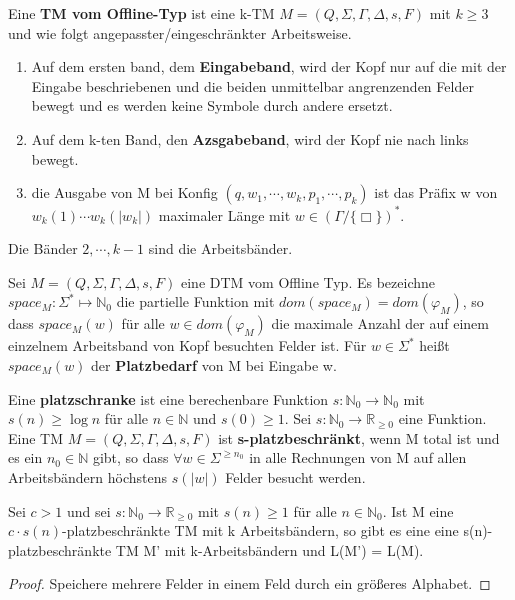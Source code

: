 {}

    Eine \textbf{TM vom Offline-Typ} ist eine k-TM \(M = (Q, \Sigma, \Gamma, \Delta, s, F)\) mit \(k \geq 3\) und wie folgt angepasster/eingeschränkter Arbeitsweise.
    \begin{enumerate}
        \item Auf dem ersten band, dem \textbf{Eingabeband}, wird der Kopf nur auf die mit der Eingabe beschriebenen und die beiden unmittelbar angrenzenden Felder bewegt und es werden keine Symbole durch andere ersetzt.
        \item Auf dem k-ten Band, den \textbf{Azsgabeband}, wird der Kopf nie nach links bewegt.
        \item die Ausgabe von M bei Konfig \((q, w_1,\cdots, w_k, p_1, \cdots, p_k)\) ist das Präfix w von \(w_k(1) \cdots w_k(|w_k|)\) maximaler Länge mit \(w \in (\Gamma / \{\Box\})^*\).
    \end{enumerate}
    Die Bänder \(2, \cdots, k-1\) sind die Arbeitsbänder.

    Sei \(M = (Q, \Sigma, \Gamma, \Delta, s, F)\) eine DTM vom Offline Typ. Es bezeichne \(space_M : \Sigma^* \mapsto \mathbb{N}_0\) die partielle Funktion mit \(dom(space_M) = dom(\varphi_M)\), so dass \(space_M(w)\) für alle \(w \in dom(\varphi_M)\) die maximale Anzahl der auf einem einzelnem Arbeitsband von Kopf besuchten Felder ist. Für \(w \in \Sigma^*\) heißt \(space_M(w)\) der \textbf{Platzbedarf} von M bei Eingabe w.

    Eine \textbf{platzschranke} ist eine berechenbare Funktion \(s: \mathbb{N}_0 \to \mathbb{N}_0\) mit \(s(n) \geq \log n\) für alle \(n \in \mathbb{N}\) und \(s(0) \geq 1\). Sei \(s : \mathbb{N}_0 \to \mathbb{R}_{\geq 0}\) eine Funktion. Eine TM \(M = (Q, \Sigma, \Gamma, \Delta, s, F)\) ist \textbf{s-platzbeschränkt}, wenn M total ist und es ein \(n_0 \in \mathbb{N}\) gibt, so dass \(\forall w \in \Sigma^{\geq n_0}\) in alle Rechnungen von M auf allen Arbeitsbändern höchstens \(s (|w|)\) Felder besucht werden.

    Sei \(c > 1\) und sei \(s: \mathbb{N}_0 \to \mathbb{R}_{\geq 0}\) mit \(s(n)\geq 1\) für alle \(n \in \mathbb{N}_0\). Ist M eine \(c \cdot s(n)\)-platzbeschränkte TM mit k Arbeitsbändern, so gibt es eine eine s(n)-platzbeschränkte TM M' mit k-Arbeitsbändern und L(M') = L(M).
    \begin{proof}
        Speichere mehrere Felder in einem Feld durch ein größeres Alphabet.
    \end{proof}

